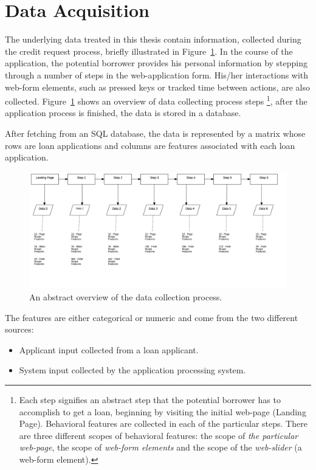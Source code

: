 \section{Data Acquisition}\label{Ch:2:Acquisition}
The underlying data treated in this thesis contain information, collected during the credit request process, briefly illustrated in Figure~\ref{fig:behav-data}. In the course of the application, the potential borrower provides his personal information by stepping through a number of steps in the web-application form. His/her interactions with web-form elements, such as pressed keys or tracked time between actions, are also collected. Figure~\ref{fig:behav-data} shows an overview of data collecting process steps \footnote{Each step signifies an abstract step that the potential borrower has to accomplish to get a loan, beginning by visiting the initial web-page (Landing Page). Behavioral features are collected in each of the particular steps. There are three different scopes of behavioral features: the scope of \textit{the particular web-page}, the scope of \textit{web-form elements} and the scope of the \textit{web-slider} (a web-form element).}, after the application process is finished, the data is stored in a database. 

After fetching from an SQL database, the data is represented by a matrix whose rows are loan applications and columns are features associated with each loan application. 

\begin{figure}[h!]
    \centering
    \includegraphics[scale=0.20]{Graphics/FlowchartDiagram1.png}
    \caption{An abstract overview of the data collection process.}
    \label{fig:behav-data}
\end{figure}

The features are either categorical or numeric and come from the two different sources:
\begin{itemize}
    \item Applicant input collected from a loan applicant.
    \item System input collected by the application processing system.
\end{itemize}

